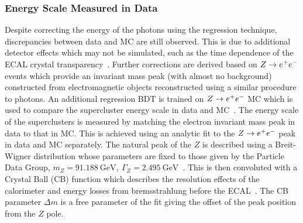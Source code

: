 \subsubsection{Energy Scale Measured in Data}
Despite correcting the energy of the photons using the regression technique, discrepancies between data and
MC are still observed. This is due to additional detector effects which may not be simulated, such as the
time dependence of the ECAL crystal transparency~\citep{CMS-DP-2012-007}. Further corrections are
derived based on $Z\rightarrow e^{+}e^{-}$ events which provide an invariant mass peak (with almost no background) constructed from 
electromagnetic objects reconstructed using a similar procedure to photons.
An additional regression BDT is trained on $Z\rightarrow e^{+}e^{-}$ MC which is used
to compare the supercluster energy scale in data and MC~\citep{AN-12-048}.
The energy scale of the superclusters is measured by matching the electron
invariant mass peak in data to that in MC. This is achieved using an analytic fit to the $Z\rightarrow e^{+}e^{-}$ peak in data and MC
separately. The natural peak of the $Z$ is described using a Breit-Wigner distribution whose parameters are fixed
to those given by the Particle Data Group, $m_{Z}=91.188~\textrm{GeV},~\Gamma_{Z} = 2.495~\textrm{GeV}$~\citep{pdg}. This is then convoluted 
with a Crystal Ball (CB) function which describes the resolution effects of the calorimeter and energy losses from 
bremsstrahlung before the ECAL~\citep{crystalball}. 
The CB parameter $\Delta m$ is a free parameter of the fit giving the 
offset of the peak position from the $Z$ pole. 

